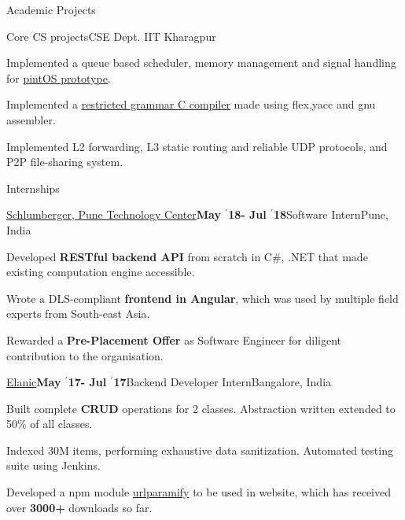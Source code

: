 \documentclass{resume} %
\begin{document}
\begin{rSection}{Academic Projects}
\begin{rSubsection}{ \large Core CS projects}{}{}{CSE Dept. IIT Kharagpur}

\item Implemented a queue based scheduler, memory management and signal handling for \href{https://github.com/kaustubhhiware/OSLab}{pintOS prototype}.
\item Implemented a \href{https://github.com/kaustubhhiware/cOMPILER}{restricted grammar C compiler} made using flex,yacc and gnu assembler.
\item Implemented L2 forwarding, L3 static routing and reliable UDP protocols, and P2P file-sharing system.
\end{rSubsection}



\end{rSection}



\begin{rSection}{Internships}
\begin{rSubsection}{\large \href{https://drive.google.com/file/d/1EcfIC_g8bx3whaxMdOkFyZx4TCqA1RAq/view?usp=sharing}{Schlumberger, Pune Technology Center}}{\textbf{\large May $^{\prime}$18- Jul $^{\prime}$18}}{Software Intern}{Pune, India}
\item Developed {\bf RESTful backend API} from scratch in C\#, .NET that made existing computation engine accessible.
\item Wrote a DLS-compliant {\bf frontend in Angular}, which was used  by multiple field experts from South-east Asia.
\item Rewarded a {\bf Pre-Placement Offer} as Software Engineer for diligent contribution to the organisation.
\end{rSubsection}

\begin{rSubsection}{\large \href{https://drive.google.com/file/d/0B5iU6cWw36rOVWZIcllPY3RSd2c/view?usp=sharing}{Elanic}}{\textbf{\large May $^{\prime}$17- Jul $^{\prime}$17}}{Backend Developer Intern}{Bangalore, India}
\item Built complete \textbf{CRUD} operations for 2 classes. Abstraction written extended to 50\% of all classes.
\item Indexed 30M items, performing exhaustive data sanitization. Automated testing suite using Jenkins.
\item Developed a npm module \href{https://www.npmjs.com/package/urlparamify}{urlparamify} to be used in website, which has received over \textbf{3000+} downloads so far.
\end{rSubsection}


\end{rSection}
\end{document}
